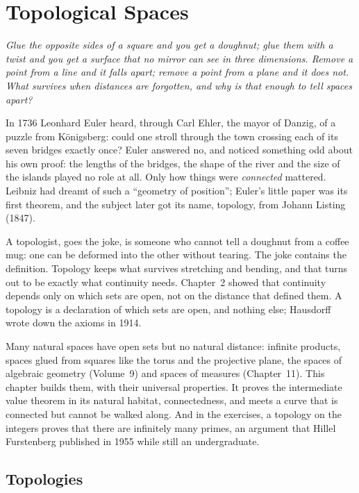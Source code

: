 \chapter{Topological Spaces}

\begin{center}\itshape
Glue the opposite sides of a square and you get a doughnut; glue them with a twist and you get a surface that no
mirror can see in three dimensions. Remove a point from a line and it falls apart; remove a point from a plane and it
does not. What survives when distances are forgotten, and why is that enough to tell spaces apart?
\end{center}

In 1736 Leonhard Euler heard, through Carl Ehler, the mayor of Danzig, of a puzzle from K\"onigsberg: could one stroll through the town crossing each of its
seven bridges exactly once? Euler answered no, and noticed something odd about his own proof: the lengths of the
bridges, the shape of the river and the size of the islands played no role at all. Only how things were \emph{connected}
mattered. Leibniz had dreamt of such a ``geometry of position''; Euler's little paper was its first theorem, and the
subject later got its name, topology, from Johann Listing (1847).

A topologist, goes the joke, is someone who cannot tell a doughnut from a coffee mug: one can be deformed into the other
without tearing. The joke contains the definition. Topology keeps what survives stretching and bending, and that turns out
to be exactly what continuity needs. Chapter~2 showed that continuity depends only on which sets are open, not on the
distance that defined them. A topology is a declaration of which sets are open, and nothing else; Hausdorff wrote down
the axioms in 1914.

Many natural spaces have open sets but no natural distance: infinite products, spaces glued from squares like the torus and
the projective plane, the spaces of algebraic geometry (Volume~9) and spaces of measures (Chapter~11). This chapter builds them,
with their universal properties. It proves the intermediate value theorem in its natural habitat, connectedness, and meets
a curve that is connected but cannot be walked along. And in the exercises, a topology on the integers proves that there are
infinitely many primes, an argument that Hillel Furstenberg published in 1955 while still an undergraduate.

\section{Topologies}

